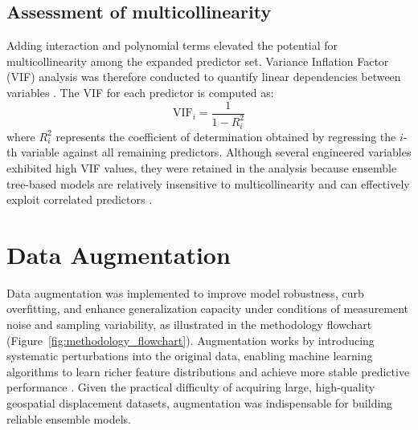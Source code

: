 \documentclass[oneside,doublespacing,flushright]{lsuthesis}
\begin{document}
\subsection{Assessment of multicollinearity}
Adding interaction and polynomial terms elevated the potential for multicollinearity among the expanded predictor set. Variance Inflation Factor (VIF) analysis was therefore conducted to quantify linear dependencies between variables \citep{Dormann2013}. The VIF for each predictor is computed as:
\begin{equation}
\text{VIF}_i = \frac{1}{1 - R_i^2}
\end{equation}
where $R_i^2$ represents the coefficient of determination obtained by regressing the $i$-th variable against all remaining predictors. Although several engineered variables exhibited high VIF values, they were retained in the analysis because ensemble tree-based models are relatively insensitive to multicollinearity and can effectively exploit correlated predictors \citep{Dormann2013}.

\section{Data Augmentation}
Data augmentation was implemented to improve model robustness, curb overfitting, and enhance generalization capacity under conditions of measurement noise and sampling variability, as illustrated in the methodology flowchart (Figure~\ref{fig:methodology_flowchart}). Augmentation works by introducing systematic perturbations into the original data, enabling machine learning algorithms to learn richer feature distributions and achieve more stable predictive performance \citep{Shorten2019}. Given the practical difficulty of acquiring large, high-quality geospatial displacement datasets, augmentation was indispensable for building reliable ensemble models.
\end{document}
